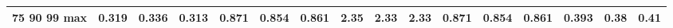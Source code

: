 \begin{tabular}{lrrrrrrrrrrrrrrr}
75%
90%
99%
max & 0.319 & 0.336 & 0.313 & 0.871 & 0.854 & 0.861 & 2.35 & 2.33 & 2.33 & 0.871 & 0.854 & 0.861 & 0.393 & 0.38 & 0.41 \\
\bottomrule
\end{tabular}